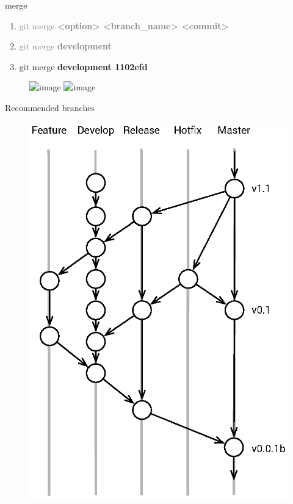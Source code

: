 \documentclass{beamer}
\begin{document}
\begin{frame}{merge}

    \begin{enumerate}[\$]
        \item<1-> \textcolor<2->{gray}{
                \Large{git merge \textbf{<option> <branch\_name> <commit>}}}
        \item<2-> \textcolor<3->{gray}{
                \Large{git merge \textbf<2->{development}}}
        \item<3-> \Large{git merge \textbf<3->{development 1102efd}}
    \end{enumerate}

    \begin{figure}
        \center
        \includegraphics<1>[width=.8\textwidth]{git-branching-5}
        \includegraphics<2->[width=.8\textwidth]{git-branching-6}
        \label{fig:git-current-branch}
    \end{figure}
\end{frame}

\begin{frame}{Recommended branches}
    \begin{figure}
        \center
        \includegraphics[height=.8\textheight]{git-recommended-branches}
        \label{fig:git-recommanded-branches}
    \end{figure}
\end{frame}
\end{document}
